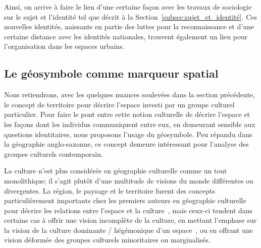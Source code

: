 Ainsi, on arrive à faire le lien d'une certaine façon avec les travaux de sociologie sur le sujet et l'identité tel que décrit à la Section~\ref{subsec:sujet_et_identité}. 
Ces nouvelles identités, naissants en partie des luttes pour la reconnaissance et d'une certaine distance avec les identités nationales, trouvent également un lieu pour l'organisation dans les espaces urbains.





\subsection{Le géosymbole comme marqueur spatial}
\label{sec:le_symbole_comme_marqueur_spatial} Nous retiendrons, avec les quelques nuances soulevées dans la section précédente, le concept de territoire pour décrire l'espace investi par un groupe culturel particulier. 
Pour faire le pont entre cette notion culturelle de décrire l'espace et les façons dont les individus communiquent entre eux, en demeurant sensible aux questions identitaires, nous proposons l'usage du géosymbole. 
Peu répandu dans la géographie anglo-saxonne, ce concept demeure intéressant pour l'analyse des groupes culturels contemporain.

La culture n'est plus considérée en géographie culturelle comme un tout monolithique; il s'agit plutôt d'une multitude de visions du monde différentes ou divergentes. 
La région, le paysage et le territoire furent des concepts particulièrement importants chez les premiers auteurs en géographie culturelle pour décrire les relations entre l'espace et la culture~\citep{Bonnemaison1981,Monnet1998,DiMeo1998,}, mais ceux-ci tendent dans certains cas à offrir une vision incomplète de la culture, en mettant l'emphase sur la vision de la culture dominante / hégémonique d'un espace~\citep[11-12]{Duncan1993}, ou en offrant une vision déformée des groupes culturels minoritaires ou marginalisés.

